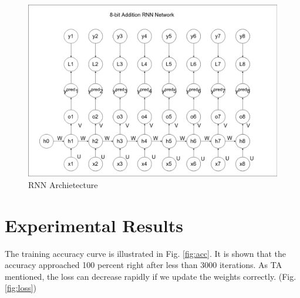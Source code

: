 \documentclass[12pt,a4paper]{article}
\begin{document}
\begin{figure}[hbt]
\centering
\includegraphics[scale=0.3]{rnn.png}
\caption{RNN Archietecture}
\label{fig:rnn}
\end{figure} 


\section{Experimental Results} \label{sec:res}
The training accuracy curve is illustrated in Fig. \ref{fig:acc}. It is shown that the accuracy approached 100 percent right after less than 3000 iterations. As TA mentioned, the loss can decrease rapidly if we update the weights correctly. (Fig. \ref{fig:loss})
\end{document}
